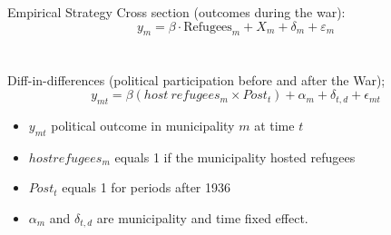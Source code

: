 \documentclass[xcolor=dvipsnames, aspectratio=169]{beamer}
\begin{document}
\begin{frame}{Empirical Strategy}
Cross section (outcomes during the war): 
\begin{equation}\label{equation:refugees_resistance}
    y_{m} = \beta \cdot \text{Refugees}_{m} + X_{m} + \delta_{m} + \varepsilon_{m}
\end{equation}
\\
\vspace{0.2in}
\\
Diff-in-differences (political participation before and after the War);
\begin{equation}
     y_{mt} = \beta (host \ refugees_{m} \times Post_t)+ \alpha_{m} + \delta_{t,d} + \epsilon_{mt}
\end{equation}

\begin{itemize}
    \item  $y_{mt}$  political outcome in municipality $m$ at time $t$
    \item $host refugees_{m}$ equals 1 if the municipality hosted refugees
    \item $Post_t$ equals 1 for periods after 1936
    \item $\alpha_{m}$ and $\delta_{t,d}$ are municipality and time fixed effect.
\end{itemize}


\end{frame}

 
\end{document}
